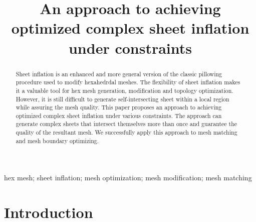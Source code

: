 \documentclass[final,5p,times,twocolumn]{elsarticle}
\begin{document}
\begin{frontmatter}

\title{An approach to achieving optimized complex sheet inflation under constraints}


\begin{abstract}
Sheet inflation is an enhanced and more general version of the classic pillowing procedure\cite{Mitchell:1995wa} used to modify hexahedrdal meshes. The flexibility of sheet inflation makes it a valuable tool for hex mesh generation, modification and topology optimization. However, it is still difficult to generate self-intersecting sheet within a local region while assuring the mesh quality. This paper proposes an approach to achieving optimized complex sheet inflation under various constraints. The approach can generate complex sheets that intersect themselves more than once and guarantee the quality of the resultant mesh. We successfully apply this approach to mesh matching and mesh boundary optimizing.
\end{abstract}

\begin{keyword}
hex mesh; sheet inflation; mesh optimization; mesh modification; mesh matching

\end{keyword}

\end{frontmatter}

\linenumbers

\section{Introduction}
\label{sec:intro}
\end{document}
